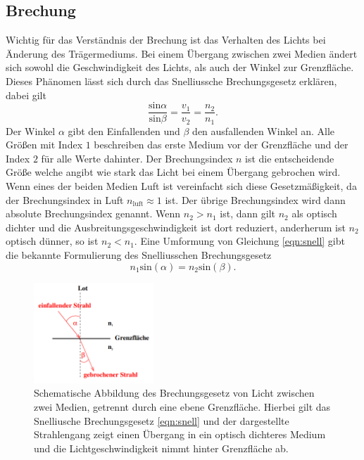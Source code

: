 \subsection{Brechung}
Wichtig für das Verständnis der Brechung ist das Verhalten des Lichts bei Änderung des Trägermediums. Bei einem Übergang zwischen zwei Medien ändert sich sowohl die Geschwindigkeit des Lichts, als auch der Winkel zur Grenzfläche.
Dieses Phänomen lässt sich durch das Snelliussche Brechungsgesetz erklären, dabei gilt \cite{skript}
\begin{equation}
    \label{eqn:snell}
    \frac{\text{sin}\alpha}{\text{sin} \beta} = \frac{v_1}{v_2} = \frac{n_2}{n_1}.
\end{equation}
Der Winkel $\alpha$ gibt den Einfallenden und $\beta$ den ausfallenden Winkel an. Alle Größen mit Index $1$ beschreiben das erste Medium vor der Grenzfläche und der Index $2$ für alle Werte dahinter. Der Brechungsindex $n$ ist die
entscheidende Größe welche angibt wie stark das Licht bei einem Übergang gebrochen wird. Wenn eines der beiden Medien Luft ist vereinfacht sich diese Gesetzmäßigkeit, da der Brechungsindex in Luft $n_{\text{luft}} \approx 1$ ist. Der übrige
Brechungsindex wird dann absolute Brechungsindex genannt.
Wenn $n_2 > n_1$ ist, dann gilt $n_2$ als optisch dichter und die Ausbreitungsgeschwindigkeit ist dort reduziert, anderherum ist $n_2$ optisch dünner, so ist $n_2 < n_1$.
Eine Umformung von Gleichung \eqref{eqn:snell} gibt die bekannte Formulierung des Snelliusschen Brechungsgesetz \cite{skript}
\begin{equation}
n_1 \text{sin}(\alpha) = n_2 \text{sin}(\beta).
\end{equation}
\begin{figure}
    \centering
    \includegraphics[width=0.4\textwidth]{bilder/2.png}
    \caption{Schematische Abbildung des Brechungsgesetz von Licht zwischen zwei Medien, getrennt durch eine ebene Grenzfläche. Hierbei gilt das Snelliusche Brechungsgesetz \eqref{eqn:snell} und der dargestellte Strahlengang zeigt einen Übergang in ein optisch
    dichteres Medium und die Lichtgeschwindigkeit nimmt hinter Grenzfläche ab.\cite{skript}}
    \label{fig:brechung}
\end{figure}

